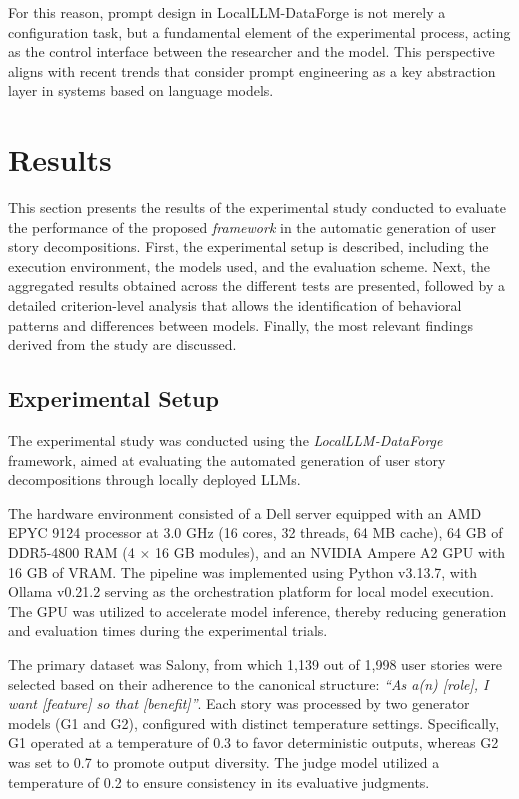 \documentclass[pdflatex,sn-mathphys-num]{sn-jnl}
\theoremstyle{thmstyleone}%
\theoremstyle{thmstyletwo}%
\theoremstyle{thmstylethree}%
\begin{document}
For this reason, prompt design in LocalLLM-DataForge is not merely a configuration task, but a fundamental element of the experimental process, acting as the control interface between the researcher and the model. This perspective aligns with recent trends that consider prompt engineering as a key abstraction layer in systems based on language models.

\section{Results}\label{sec4}

This section presents the results of the experimental study conducted to evaluate the performance of the proposed \textit{framework} in the automatic generation of user story decompositions. First, the experimental setup is described, including the execution environment, the models used, and the evaluation scheme. Next, the aggregated results obtained across the different tests are presented, followed by a detailed criterion-level analysis that allows the identification of behavioral patterns and differences between models. Finally, the most relevant findings derived from the study are discussed.

\subsection{Experimental Setup}

The experimental study was conducted using the \textit{LocalLLM-DataForge} framework, aimed at evaluating the automated generation of user story decompositions through locally deployed LLMs.

The hardware environment consisted of a Dell server equipped with an AMD EPYC 9124 processor at 3.0 GHz (16 cores, 32 threads, 64 MB cache), 64 GB of DDR5-4800 RAM (4 $\times$ 16 GB modules), and an NVIDIA Ampere A2 GPU with 16 GB of VRAM. The pipeline was implemented using Python v3.13.7, with Ollama v0.21.2 serving as the orchestration platform for local model execution. The GPU was utilized to accelerate model inference, thereby reducing generation and evaluation times during the experimental trials.

The primary dataset was Salony, from which 1,139 out of 1,998 user stories were selected based on their adherence to the canonical structure: \textit{“As a(n) [role], I want [feature] so that [benefit]”}. Each story was processed by two generator models (G1 and G2), configured with distinct temperature settings. Specifically, G1 operated at a temperature of 0.3 to favor deterministic outputs, whereas G2 was set to 0.7 to promote output diversity. The judge model utilized a temperature of 0.2 to ensure consistency in its evaluative judgments.
\end{document}
